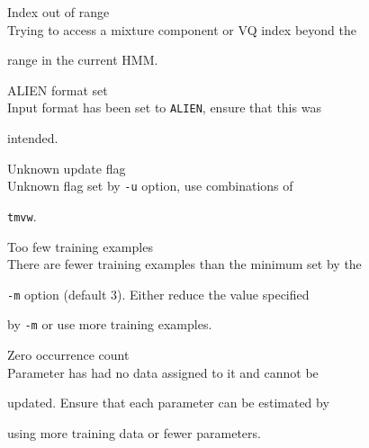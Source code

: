 \begin{itemize}
\begin{itemize}
    Index out of range\\


        Trying to access a mixture component or VQ index beyond the


        range in the current HMM.





    ALIEN format set\\


        Input format has been set to \texttt{ALIEN}, ensure that this was 


        intended.





\end{itemize}










\begin{itemize}


    Unknown update flag\\


        Unknown flag set by \texttt{-u} option, use combinations of 


        \texttt{tmvw}.





    Too few training examples\\


        There are fewer training examples than the minimum set by the 


        \texttt{-m} option (default 3).  Either reduce the value specified


        by \texttt{-m} or use more training examples.





    Zero occurrence count\\


        Parameter has had no data assigned to it and cannot be


        updated.  Ensure that each parameter can be estimated by


        using more training data or fewer parameters.






\end{itemize}
\end{itemize}
